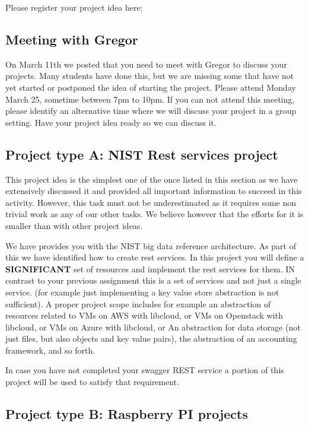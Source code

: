 Please register your project idea here:


\subsection{Meeting with Gregor}

On March 11th we posted that you need to meet with Gregor to discuss
your projects. Many students have done this, but we are missing some
that have not yet started or postponed the idea of starting the
project. Please attend Monday March 25, sometime between 7pm to 10pm.
If you can not attend this meeting, please identify an alternative
time where we will discuss your project in a group setting. Have your
project idea ready so we can discuss it.

\subsection{Project type A: NIST Rest services project}

This project idea is the simplest one of the once listed in this
section as we have extensively discussed it and provided all important
information to succeed in this activity. However, this task must not
be underestimated as it requires some non trivial work as any of our
other tasks. We believe however that the efforts for it is smaller
than with other project ideas.

We have provides you with the NIST big data reference architecture. As
part of this we have identified how to create rest services. In this
project you will define a \textbf{SIGNIFICANT} set of resources and implement
the rest services for them. IN contrast to your previous assignment
this is a set of services and not just a single service. (for example
just implementing a key value store abstraction is not sufficient). A
proper project scope includes for example an abstraction of resources
related to VMs on AWS with libcloud, or VMs on Openstack with
libcloud, or VMs on Azure with libcloud, or An abstraction for data
storage (not just files, but also objects and key value pairs), the
abstraction of an accounting framework, and so forth.

In case you have not completed your swagger REST service a portion of
this project will be used to satisfy that requirement.

\subsection{Project type B: Raspberry PI projects}

